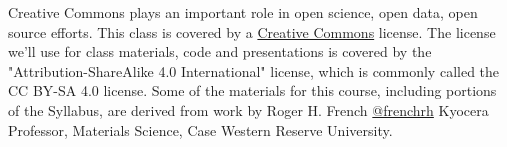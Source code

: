 \documentclass[11pt]{article} %
\begin{document}
    Creative Commons plays an important role in open science, open data, open source efforts. This class is covered by a \href{"http://creativecommons.org/licenses/"}{Creative Commons} license. The license we'll use for class materials, code and presentations is covered by  the "Attribution-ShareAlike 4.0 International" license, which is commonly called the CC BY-SA 4.0 license. Some of the materials for this course, including portions of the Syllabus, are derived from work by Roger H. French \href{"https://twitter.com/frenchrh"}{@frenchrh} Kyocera Professor, Materials Science, Case Western Reserve University.

\end{document}
